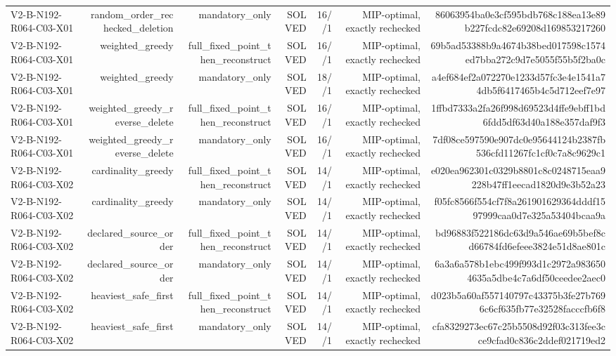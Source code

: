 {\begin{longtable}{lrrrrrr}
V2-B-N192-R064-C03-X01 & random\_order\_rechecked\_deletion & mandatory\_only & SOLVED & 16//1 & MIP-optimal, exactly rechecked & 86063954ba0e3cf595bdb768c188ea13e89b227fcdc82e69208d169853217260 \\
V2-B-N192-R064-C03-X01 & weighted\_greedy & full\_fixed\_point\_then\_reconstruct & SOLVED & 16//1 & MIP-optimal, exactly rechecked & 69b5ad53388b9a4674b38bed017598c1574ed7bba272c9d7e5055f55b5f2ba0c \\
V2-B-N192-R064-C03-X01 & weighted\_greedy & mandatory\_only & SOLVED & 18//1 & MIP-optimal, exactly rechecked & a4ef684ef2a072270e1233d57fc3e4e1541a74db5f6417465b4c5d712eef7e97 \\
V2-B-N192-R064-C03-X01 & weighted\_greedy\_reverse\_delete & full\_fixed\_point\_then\_reconstruct & SOLVED & 16//1 & MIP-optimal, exactly rechecked & 1ffbd7333a2fa26f998d69523d4ffe9ebff1bd6fdd5df63d40a188e357daf9f3 \\
V2-B-N192-R064-C03-X01 & weighted\_greedy\_reverse\_delete & mandatory\_only & SOLVED & 16//1 & MIP-optimal, exactly rechecked & 7df08ce597590e907dc0e95644124b2387fb536cfd11267fc1cf0c7a8c9629c1 \\
V2-B-N192-R064-C03-X02 & cardinality\_greedy & full\_fixed\_point\_then\_reconstruct & SOLVED & 14//1 & MIP-optimal, exactly rechecked & e020ea962301c0329b8801c8c0248715eaa9228b47ff1eecad1820d9e3b52a23 \\
V2-B-N192-R064-C03-X02 & cardinality\_greedy & mandatory\_only & SOLVED & 14//1 & MIP-optimal, exactly rechecked & f05fc8566f554cf7f8a261901629364dddf1597999caa0d7e325a53404bcaa9a \\
V2-B-N192-R064-C03-X02 & declared\_source\_order & full\_fixed\_point\_then\_reconstruct & SOLVED & 14//1 & MIP-optimal, exactly rechecked & bd96883f522186dc63d9a546ae69b5bef8cd66784fd6efeee3824e51d8ae801c \\
V2-B-N192-R064-C03-X02 & declared\_source\_order & mandatory\_only & SOLVED & 14//1 & MIP-optimal, exactly rechecked & 6a3a6a578b1ebc499f993d1c2972a9836504635a5dbe4c7a6df50ceedee2aec0 \\
V2-B-N192-R064-C03-X02 & heaviest\_safe\_first & full\_fixed\_point\_then\_reconstruct & SOLVED & 14//1 & MIP-optimal, exactly rechecked & d023b5a60af557140797c43375b3fe27b7696c6cf635fb77e32528facccfb6f8 \\
V2-B-N192-R064-C03-X02 & heaviest\_safe\_first & mandatory\_only & SOLVED & 14//1 & MIP-optimal, exactly rechecked & cfa8329273ec67c25b5508d92f03c313fee3cce9cfad0c836c2ddef021719ed2 \\

\end{longtable}}
